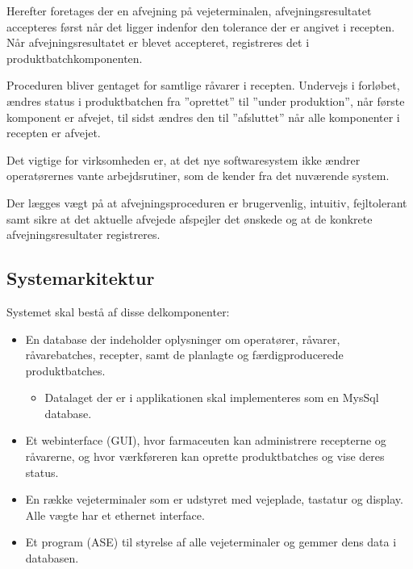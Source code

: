 \documentclass[a4paper]{article}
\begin{document}
Herefter foretages der en afvejning på vejeterminalen, afvejningsresultatet accepteres først når det ligger indenfor den tolerance der er angivet i recepten. Når afvejningsresultatet er blevet accepteret, registreres det i produktbatchkomponenten. 

Proceduren bliver gentaget for samtlige råvarer i recepten. Undervejs i forløbet, ændres status i produktbatchen fra ”oprettet” til ”under produktion”, når første komponent er afvejet, til sidst ændres den til ”afsluttet” når alle komponenter i recepten er afvejet.

Det vigtige for virksomheden er, at det nye softwaresystem ikke ændrer operatørernes vante arbejdsrutiner, som de kender fra det nuværende system.

Der lægges vægt på at afvejningsproceduren er brugervenlig, intuitiv, fejltolerant samt sikre at det aktuelle afvejede afspejler det ønskede og at de konkrete afvejningsresultater registreres.



\subsection{Systemarkitektur} %

Systemet skal bestå af disse delkomponenter:

\begin{itemize}
  \item En database der indeholder oplysninger om operatører, råvarer, råvarebatches, recepter, samt de planlagte og færdigproducerede produktbatches. 
    \begin{itemize}
      \item Datalaget der er i applikationen skal implementeres som en MysSql database.
    \end{itemize}
  \item Et webinterface (GUI), hvor farmaceuten kan administrere recepterne og råvarerne, og hvor værkføreren kan oprette produktbatches og vise deres status.
  \item En række vejeterminaler som er udstyret med vejeplade, tastatur og display. Alle vægte har et ethernet interface. 
  \item Et program (ASE) til styrelse af alle vejeterminaler og gemmer dens data i databasen.
\end{itemize}

\end{document}
